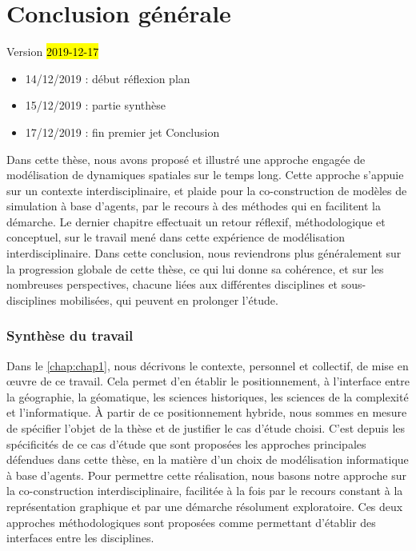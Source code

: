 \graphicspath{{chap7-Conclusion/}}

\chapter*{Conclusion générale}
\label{chap:conclu}
\vspace*{-5em}
\begin{center}
	{\large Version \hl{2019-12-17}}
\end{center}
\vspace*{-1em}
\begin{itemize}
	\item 14/12/2019 : début réflexion plan
	\item 15/12/2019 : partie synthèse
	\item 17/12/2019 : fin premier jet Conclusion
\end{itemize}

Dans cette thèse, nous avons proposé et illustré une approche engagée de modélisation de dynamiques spatiales sur le temps long.
Cette approche s'appuie sur un contexte interdisciplinaire, et plaide pour la co-construction de modèles de simulation à base d'agents, par le recours à des méthodes qui en facilitent la démarche.
Le dernier chapitre effectuait un retour réflexif, méthodologique et conceptuel, sur le travail mené dans cette expérience de modélisation interdisciplinaire.
Dans cette conclusion, nous reviendrons plus généralement sur la progression globale de cette thèse, ce qui lui donne sa cohérence, et sur les nombreuses perspectives, chacune liées aux différentes disciplines et sous-disciplines mobilisées, qui peuvent en prolonger l'étude.

\subsection*{Synthèse du travail}

Dans le \cref{chap:chap1}, nous décrivons le contexte, personnel et collectif, de mise en œuvre de ce travail.
Cela permet d'en établir le positionnement, à l'interface entre la géographie, la géomatique, les sciences historiques, les sciences de la complexité et l'informatique.
À partir de ce positionnement hybride, nous sommes en mesure de spécifier l'objet de la thèse et de justifier le cas d'étude choisi.
C'est depuis les spécificités de ce cas d'étude que sont proposées les approches principales défendues dans cette thèse, en la matière d'un choix de modélisation informatique à base d'agents.
Pour permettre cette réalisation, nous basons notre approche sur la co-construction interdisciplinaire, facilitée à la fois par le recours constant à la représentation graphique et par une démarche résolument exploratoire.
Ces deux approches méthodologiques sont proposées comme permettant d'établir des interfaces entre les disciplines.

